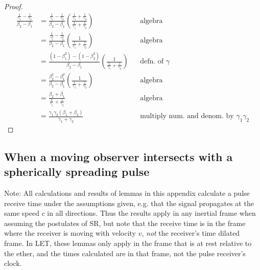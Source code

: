 \documentclass[a4paper]{article}
\theoremstyle{plain}
\theoremstyle{definition}
\begin{document}
\begin{proof}
\begin{align*}
\frac{\frac{1}{\gamma_1}-\frac{1}{\gamma_2}}{\beta_2-\beta_1}
  & = \frac{\frac{1}{\gamma_1}-\frac{1}{\gamma_2}}{\beta_2-\beta_1} \left( \frac{\frac{1}{\gamma_1}+\frac{1}{\gamma_2}}{\frac{1}{\gamma_1}+\frac{1}{\gamma_2}} \right) & & \text{algebra} \\
  & = \frac{\frac{1}{\gamma_1^2}-\frac{1}{\gamma_2^2}}{\beta_2-\beta_1} \left( \frac{1}{\frac{1}{\gamma_1}+\frac{1}{\gamma_2}} \right) & & \text{algebra} \\
  & = \frac{(1-\beta_1^2)-(1-\beta_2^2)}{\beta_2-\beta_1} \left( \frac{1}{\frac{1}{\gamma_1}+\frac{1}{\gamma_2}} \right) & & \text{defn. of $\gamma$} \\
  & = \frac{\beta_2^2-\beta_1^2}{\beta_2-\beta_1} \left( \frac{1}{\frac{1}{\gamma_1}+\frac{1}{\gamma_2}} \right) & & \text{algebra} \\
  & = \frac{\beta_2+\beta_1}{\frac{1}{\gamma_1}+\frac{1}{\gamma_2}} & & \text{algebra} \\
  & = \frac{\gamma_1\gamma_2(\beta_1+\beta_2)}{\gamma_1+\gamma_2} & & \text{multiply num. and denom. by $\gamma_1\gamma_2$}
\end{align*}
\end{proof}


\subsection{When a moving observer intersects with a spherically spreading pulse}
\label{app:IntersectingSpreadingPulse}

Note: All calculations and results of lemmas in this appendix
calculate a pulse receive time under the assumptions given, e.g. that
the signal propagates at the same speed $c$ in all directions.  Thus
the results apply in any inertial frame when assuming the postulates
of SR, but note that the receive time is in the frame where the
receiver is moving with velocity $v$, {\em not} the receiver's time
dilated frame.
In LET, these lemmas only apply in the frame that is at rest relative
to the ether, and the times calculated are in that frame, not the
pulse receiver's clock.
\end{document}

